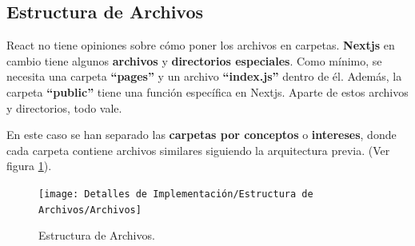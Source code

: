 \documentclass[12pt,twoside,titlepage]{report}
\begin{document}
\subsection{Estructura de Archivos}

React no tiene opiniones sobre cómo poner los archivos en carpetas. \textbf{Nextjs} en cambio tiene algunos \textbf{archivos} y \textbf{directorios especiales}. Como mínimo, se necesita una carpeta \textbf{``pages''} y un archivo \textbf{``index.js''} dentro de él. Además, la carpeta \textbf{``public''} tiene una función específica en Nextjs. Aparte de estos archivos y directorios, todo vale.

En este caso se han separado las \textbf{carpetas por conceptos} o \textbf{intereses}, donde cada carpeta contiene archivos similares siguiendo la arquitectura previa.
(Ver figura \ref{fig:Archivos}).

\begin{figure}[H]
    \centering
    \texttt{[image: Detalles de Implementación/Estructura de Archivos/Archivos]}
    \caption{Estructura de Archivos.}
    \label{fig:Archivos}
\end{figure}
\end{document}
